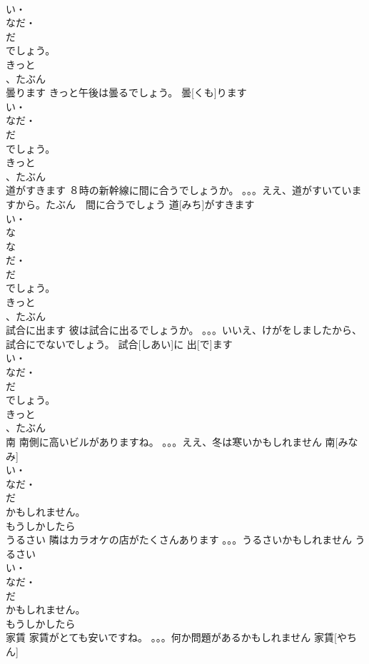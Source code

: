 \documentclass[8pt]{extreport}
\begin{document}
\begin{CJK}{UTF8}{min}
\\	い・
\\	なだ・
\\	だ
\\	でしょう。
\\	きっと
\\	、たぶん
\\	曇ります	きっと午後は曇るでしょう。	曇[くも]ります			
\\	い・
\\	なだ・
\\	だ
\\	でしょう。
\\	きっと
\\	、たぶん
\\	道がすきます	８時の新幹線に間に合うでしょうか。 。。。ええ、道がすいていますから。たぶん　間に合うでしょう	道[みち]がすきます			
\\	い・
\\	な
\\	な
\\	だ・
\\	だ
\\	でしょう。
\\	きっと
\\	、たぶん
\\	試合に出ます	彼は試合に出るでしょうか。 。。。いいえ、けがをしましたから、試合にでないでしょう。	試合[しあい]に 出[で]ます			
\\	い・
\\	なだ・
\\	だ
\\	でしょう。
\\	きっと
\\	、たぶん
\\	南	南側に高いビルがありますね。 。。。ええ、冬は寒いかもしれません	南[みなみ]				
\\	い・
\\	なだ・
\\	だ
\\	かもしれません。
\\	もうしかしたら
\\	うるさい	隣はカラオケの店がたくさんあります 。。。うるさいかもしれません	うるさい			
\\	い・
\\	なだ・
\\	だ
\\	かもしれません。
\\	もうしかしたら
\\	家賃	家賃がとても安いですね。 。。。何か問題があるかもしれません	家賃[やちん]			

\end{CJK}
\end{document}
